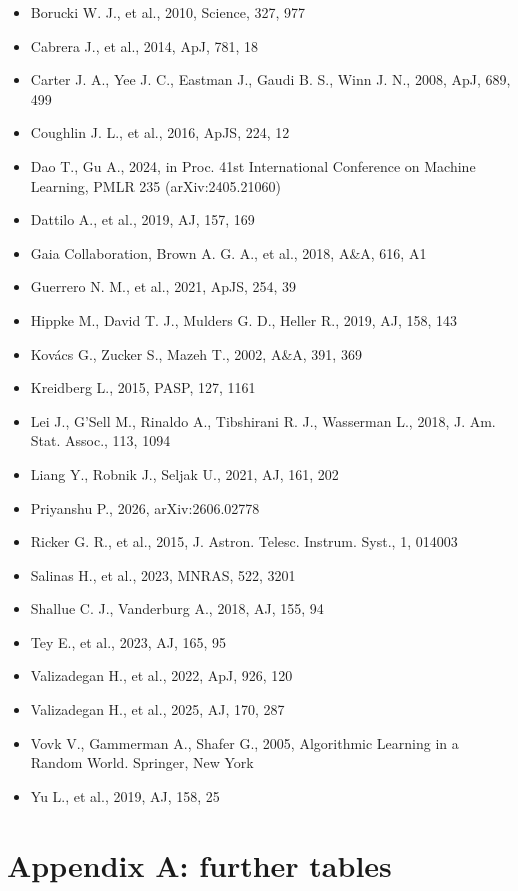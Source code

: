 \documentclass[
]{article}
\providecommand{\tightlist}{%
  \setlength{\itemsep}{0pt}\setlength{\parskip}{0pt}}
\begin{document}
\begin{itemize}
\tightlist
\item
  Borucki W. J., et al., 2010, Science, 327, 977
\item
  Cabrera J., et al., 2014, ApJ, 781, 18
\item
  Carter J. A., Yee J. C., Eastman J., Gaudi B. S., Winn J. N., 2008,
  ApJ, 689, 499
\item
  Coughlin J. L., et al., 2016, ApJS, 224, 12
\item
  Dao T., Gu A., 2024, in Proc. 41st International Conference on Machine
  Learning, PMLR 235 (arXiv:2405.21060)
\item
  Dattilo A., et al., 2019, AJ, 157, 169
\item
  Gaia Collaboration, Brown A. G. A., et al., 2018, A\&A, 616, A1
\item
  Guerrero N. M., et al., 2021, ApJS, 254, 39
\item
  Hippke M., David T. J., Mulders G. D., Heller R., 2019, AJ, 158, 143
\item
  Kovács G., Zucker S., Mazeh T., 2002, A\&A, 391, 369
\item
  Kreidberg L., 2015, PASP, 127, 1161
\item
  Lei J., G'Sell M., Rinaldo A., Tibshirani R. J., Wasserman L., 2018,
  J. Am. Stat. Assoc., 113, 1094
\item
  Liang Y., Robnik J., Seljak U., 2021, AJ, 161, 202
\item
  Priyanshu P., 2026, arXiv:2606.02778
\item
  Ricker G. R., et al., 2015, J. Astron. Telesc. Instrum. Syst., 1,
  014003
\item
  Salinas H., et al., 2023, MNRAS, 522, 3201
\item
  Shallue C. J., Vanderburg A., 2018, AJ, 155, 94
\item
  Tey E., et al., 2023, AJ, 165, 95
\item
  Valizadegan H., et al., 2022, ApJ, 926, 120
\item
  Valizadegan H., et al., 2025, AJ, 170, 287
\item
  Vovk V., Gammerman A., Shafer G., 2005, Algorithmic Learning in a
  Random World. Springer, New York
\item
  Yu L., et al., 2019, AJ, 158, 25
\end{itemize}

\hypertarget{appendix-a-further-tables}{%
\section{Appendix A: further tables}\label{appendix-a-further-tables}}
\end{document}
